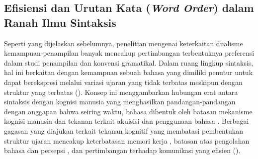 \subsection{Efisiensi dan Urutan Kata (\textit{Word Order}) dalam Ranah Ilmu Sintaksis}
Seperti yang dijelaskan sebelumnya, penelitian mengenai keterkaitan dualisme kemampuan-penampilan banyak mencakup pertimbangan terbentuknya preferensi dalam studi penampilan dan konvensi gramatikal. Dalam ruang lingkup sintaksis, hal ini berkaitan dengan kemampuan sebuah bahasa yang dimiliki penutur untuk dapat berekspresi melalui variasi ujaran yang tidak terbatas meskipun dengan struktur yang terbatas (\citealp{von1972origin, plotkin2000language}). Konsep ini menggambarkan hubungan erat antara sintaksis dengan kognisi manusia yang menghasilkan pandangan-pandangan dengan anggapan bahwa seiring waktu, bahasa dibentuk oleh batasan mekanisme kognisi manusia dan tekanan terkait akuisisi dan penggunaan bahasa \citep{plotkin2000language}. Berbagai gagasan yang diajukan terkait tekanan kognitif yang membatasi pembentukan struktur ujaran mencakup keterbatasan memori kerja \citep{slobin1973cognitive}, batasan atas pengolahan bahasa dan persepsi \citep{bever1970cognitive}, dan pertimbangan terhadap komunikasi yang efisien (\citealp{macwhinneybates1989cross, givon1991markedness, zipf1949human}). 

